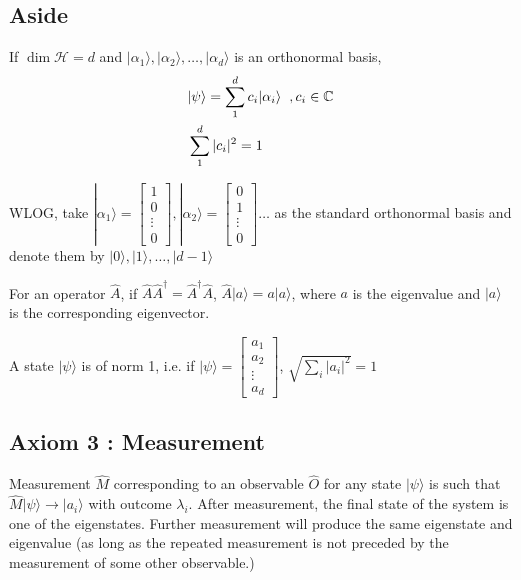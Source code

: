 \documentclass{article}
\begin{document}
\subsection{Aside}
If $\dim \mathcal{H} = d$ and ${|\alpha_1 \rangle , |\alpha_2 \rangle , \ldots , |\alpha_d \rangle}$ is an orthonormal basis,
\begin{align*}
	  & | \psi \rangle = \sum_1^d c_i | \alpha_i \rangle \hspace{0.2cm} ,c_i \in \mathbb{C} \\
	  & \sum_1^d |c_i|^2 = 1                                                                
\end{align*}

WLOG, take $| \alpha_1 \rangle = \begin{bmatrix}
1      \\
0      \\
\vdots \\
0
\end{bmatrix}, |\alpha_2 \rangle = \begin{bmatrix}
0      \\
1      \\
\vdots \\
0
\end{bmatrix} \ldots$ as the standard orthonormal basis and denote them by $|0 \rangle, |1 \rangle , \ldots ,|d-1 \rangle $

For an operator $\hat{A}$, if $\hat{A} \hat{A}^{\dagger} = \hat{A}^{\dagger} \hat{A}$, $\hat{A}|a \rangle = a | a \rangle$, where $a$ is the eigenvalue and $| a \rangle$ is the corresponding eigenvector.

A state $|\psi \rangle$ is of norm 1, i.e. if $| \psi \rangle = \begin{bmatrix}
a_1    \\
a_2    \\
\vdots \\
a_d
\end{bmatrix}$,
$\sqrt{\sum_i |a_i|^2} = 1$


\subsection{Axiom 3 : Measurement}
Measurement $\hat{M}$ corresponding to an observable $\hat{O}$ for any state $| \psi \rangle$ is such that $\hat{M} | \psi \rangle \rightarrow |a_i \rangle$ with outcome $\lambda_i$. After measurement, the final state of the system is one of the eigenstates. Further measurement will produce the same eigenstate and eigenvalue (as long as the repeated measurement is not preceded by the measurement of some other observable.)
\end{document}
